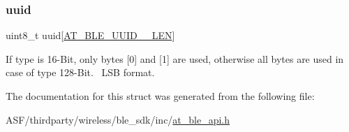 \subsubsection{\texorpdfstring{uuid}{uuid}}
{\footnotesize\ttfamily uint8\+\_\+t uuid\mbox{[}\mbox{\hyperlink{at__ble__api_8h_ad457cb8348d6bef04d1c280f172415bf}{A\+T\+\_\+\+B\+L\+E\+\_\+\+U\+U\+I\+D\+\_\+\_\+\+L\+EN}}\mbox{]}}

If type is 16-\/Bit, only bytes \mbox{[}0\mbox{]} and \mbox{[}1\mbox{]} are used, otherwise all bytes are used in case of type 128-\/Bit.~\newline
L\+SB format. 

The documentation for this struct was generated from the following file\+:\begin{DoxyCompactItemize}
\item 
A\+S\+F/thirdparty/wireless/ble\+\_\+sdk/inc/\mbox{\hyperlink{at__ble__api_8h}{at\+\_\+ble\+\_\+api.\+h}}\end{DoxyCompactItemize}
